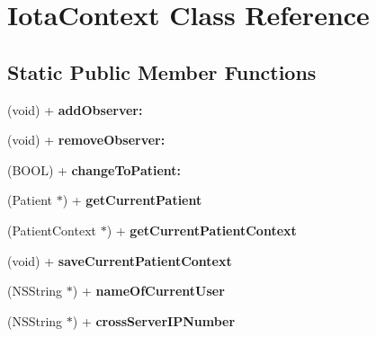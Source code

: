 \hypertarget{interface_iota_context}{
\section{IotaContext Class Reference}
\label{interface_iota_context}
}
\subsection*{Static Public Member Functions}
\begin{DoxyCompactItemize}
\item 
\hypertarget{interface_iota_context_ad56c9bbf565204787af3fd70e7afdb10}{
(void) + {\bfseries addObserver:}}
\label{interface_iota_context_ad56c9bbf565204787af3fd70e7afdb10}

\item 
\hypertarget{interface_iota_context_aa5cf6c4327551b9b85b520e7426eee28}{
(void) + {\bfseries removeObserver:}}
\label{interface_iota_context_aa5cf6c4327551b9b85b520e7426eee28}

\item 
\hypertarget{interface_iota_context_a7d9ca6a20ec93d0c167eda60100e769d}{
(BOOL) + {\bfseries changeToPatient:}}
\label{interface_iota_context_a7d9ca6a20ec93d0c167eda60100e769d}

\item 
\hypertarget{interface_iota_context_a901a764870fa6956fac44922c5514d4f}{
(Patient $\ast$) + {\bfseries getCurrentPatient}}
\label{interface_iota_context_a901a764870fa6956fac44922c5514d4f}

\item 
\hypertarget{interface_iota_context_a8d133e7be6d3c76914543a9dc40df1d6}{
(PatientContext $\ast$) + {\bfseries getCurrentPatientContext}}
\label{interface_iota_context_a8d133e7be6d3c76914543a9dc40df1d6}

\item 
\hypertarget{interface_iota_context_ac67a5b866d89f1c5d91f7a1fc174d5a7}{
(void) + {\bfseries saveCurrentPatientContext}}
\label{interface_iota_context_ac67a5b866d89f1c5d91f7a1fc174d5a7}

\item 
\hypertarget{interface_iota_context_abafa608da3d409c5c00ddbc60dbe8371}{
(NSString $\ast$) + {\bfseries nameOfCurrentUser}}
\label{interface_iota_context_abafa608da3d409c5c00ddbc60dbe8371}

\item 
\hypertarget{interface_iota_context_a80b632cd4b5646af0a114cd172537f67}{
(NSString $\ast$) + {\bfseries crossServerIPNumber}}
\label{interface_iota_context_a80b632cd4b5646af0a114cd172537f67}


\end{DoxyCompactItemize}
